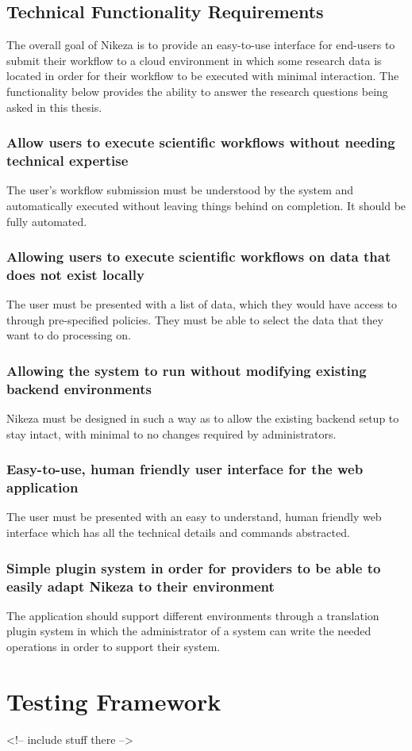 \subsection{Technical Functionality Requirements}

The overall goal of Nikeza is to provide an easy-to-use interface for end-users to submit their workflow to a cloud environment in which some research data is located in order for their workflow to be executed with minimal interaction. The functionality below provides the ability to answer the research questions being asked in this thesis.

\subsubsection{Allow users to execute scientific workflows without needing technical expertise}

The user's workflow submission must be understood by the system and automatically executed without leaving things behind on completion. It should be fully automated.

\subsubsection{Allowing users to execute scientific workflows on data that does not exist locally}

The user must be presented with a list of data, which they would have access to through pre-specified policies. They must be able to select the data that they want to do processing on.

\subsubsection{Allowing the system to run without modifying existing backend environments}

Nikeza must be designed in such a way as to allow the existing backend setup to stay intact, with minimal to no changes required by administrators. 

\subsubsection{Easy-to-use, human friendly user interface for the web application}

The user must be presented with an easy to understand, human friendly web interface which has all the technical details and commands abstracted.

\subsubsection{Simple plugin system in order for providers to be able to easily adapt Nikeza to their environment}

The application should support different environments through a translation plugin system in which the administrator of a system can write the needed operations in order to support their system.

\section{Testing Framework}
<!-- include stuff there -->